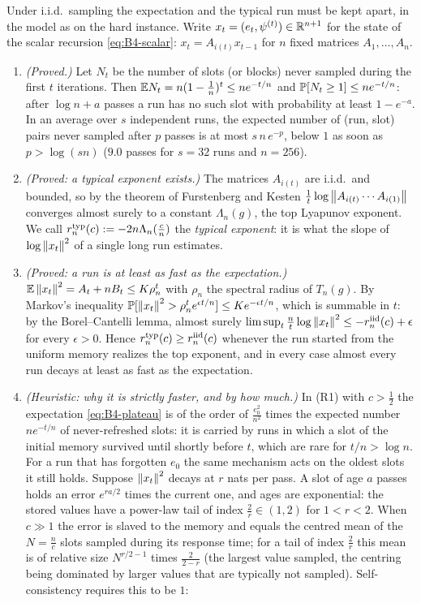 Under i.i.d.\ sampling the expectation and the typical run must be kept apart, in the model as on the hard instance. Write $x_t=(e_t,\psi^{(t)})\in\mathbb{R}^{n+1}$ for the state of the scalar recursion \eqref{eq:B4-scalar}: $x_t=A_{i(t)}x_{t-1}$ for $n$ fixed matrices $A_1,\dots,A_n$.
\begin{enumerate}[label=(\alph*),nosep]
\item \emph{(Proved.)} Let $N_t$ be the number of slots (or blocks) never sampled during the first $t$ iterations. Then $\mathbb{E} N_t=n(1-\frac1n)^t\le ne^{-t/n}$ and $\mathbb{P}[N_t\ge1]\le ne^{-t/n}$: after $\log n+a$ passes a run has no such slot with probability at least $1-e^{-a}$. In an average over $s$ independent runs, the expected number of (run, slot) pairs never sampled after $p$ passes is at most $s\,n\,e^{-p}$, below $1$ as soon as $p>\log(sn)$ ($9.0$ passes for $s=32$ runs and $n=256$).
\item \emph{(Proved: a typical exponent exists.)} The matrices $A_{i(t)}$ are i.i.d.\ and bounded, so by the theorem of Furstenberg and Kesten \cite{furstenberg1960products} $\frac1t\log\left\|A_{i(t)}\cdots A_{i(1)}\right\|$ converges almost surely to a constant $\Lambda_n(g)$, the top Lyapunov exponent. We call $r^{\rm typ}_n(c):=-2n\Lambda_n(\frac cn)$ the \emph{typical exponent}: it is what the slope of $\log\left\|x_t\right\|^2$ of a single long run estimates.
\item \emph{(Proved: a run is at least as fast as the expectation.)} $\mathbb{E}\left\|x_t\right\|^2=A_t+nB_t\le K\rho_n^t$ with $\rho_n$ the spectral radius of $T_n(g)$. By Markov's inequality $\mathbb{P}[\left\|x_t\right\|^2>\rho_n^te^{\epsilon t/n}]\le Ke^{-\epsilon t/n}$, which is summable in $t$: by the Borel--Cantelli lemma, almost surely $\limsup_t\frac nt\log\left\|x_t\right\|^2\le-r^{\rm iid}_n(c)+\epsilon$ for every $\epsilon>0$. Hence $r^{\rm typ}_n(c)\ge r^{\rm iid}_n(c)$ whenever the run started from the uniform memory realizes the top exponent, and in every case almost every run decays at least as fast as the expectation.
\item \emph{(Heuristic: why it is strictly faster, and by how much.)} In (R1) with $c>\frac12$ the expectation \eqref{eq:B4-plateau} is of the order of $\frac{e_0^2}{n^2}$ times the expected number $ne^{-t/n}$ of never-refreshed slots: it is carried by runs in which a slot of the initial memory survived until shortly before $t$, which are rare for $t/n>\log n$. For a run that has forgotten $e_0$ the same mechanism acts on the oldest slots it still holds. Suppose $\left\|x_t\right\|^2$ decays at $r$ nats per pass. A slot of age $a$ passes holds an error $e^{ra/2}$ times the current one, and ages are exponential: the stored values have a power-law tail of index $\frac2r\in(1,2)$ for $1<r<2$. When $c\gg1$ the error is slaved to the memory and equals the centred mean of the $N=\frac nc$ slots sampled during its response time; for a tail of index $\frac2r$ this mean is of relative size $N^{r/2-1}$ times $\frac2{2-r}$ (the largest value sampled, the centring being dominated by larger values that are typically not sampled). Self-consistency requires this to be $1$:

\end{enumerate}
